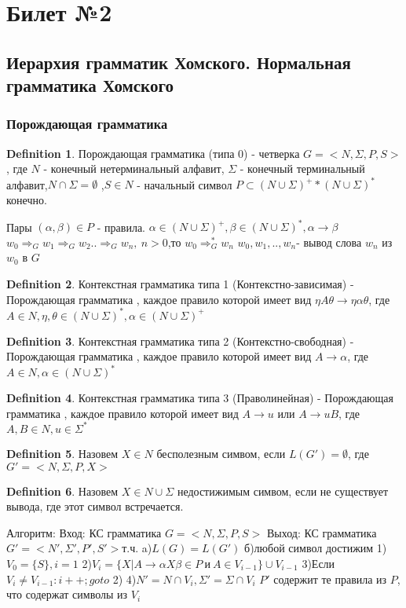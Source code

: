 \documentclass[a4paper]{article}
\theoremstyle{plain}
\theoremstyle{remark}
\theoremstyle{definition}
\newtheorem*{definition-star}{Definition}
\begin{document}
\section{Билет №2}
\subsection{Иерархия грамматик Хомского. Нормальная грамматика Хомского}
\subsubsection {Порождающая грамматика}
\begin{definition-star} Порождающая грамматика (типа 0) - четверка $G=<N,\Sigma,P,S>$, где
$N$ - конечный нетерминальный алфавит, $\Sigma$ - конечный терминальный алфавит,$N\cap\Sigma=\emptyset$ ,$S \in N$ - начальный символ
$P \subset (N\cup\Sigma)^+*(N\cup\Sigma)^*$конечно.
\end{definition-star}
Пары $(\alpha,\beta)\in P$ - правила. $\alpha \in(N\cup\Sigma)^+, \beta \in(N\cup\Sigma)^*,\alpha\rightarrow\beta$
$w_0\Rightarrow_G w_1 \Rightarrow_G w_2 ..\Rightarrow_G w_n,\ n>0$,то $w_0\Rightarrow^*_G w_n$
$w_0,w_1,..,w_n$- вывод слова $w_n$ из $w_0$ в $G$
\begin{definition-star}Контекстная грамматика типа 1 (Контекстно-зависимая) - Порождающая грамматика , каждое правило которой имеет вид $\eta A \theta \rightarrow \eta \alpha \theta$, где  $A \in N, \eta,\theta \in (N\cup\Sigma)^*, \alpha \in (N\cup \Sigma)^+$
\end{definition-star}
\begin{definition-star}Контекстная грамматика типа 2 (Контекстно-свободная) - Порождающая грамматика , каждое правило которой имеет вид $A \rightarrow  \alpha$, где  $A \in N,  \alpha \in (N\cup \Sigma)^*$
\end{definition-star}
\begin{definition-star}Контекстная грамматика типа 3 (Праволинейная) - Порождающая грамматика , каждое правило которой имеет вид $A \rightarrow  u$ или $A \rightarrow  uB$, где  $A,B \in N,  u\in \Sigma^*$
\end{definition-star}
\begin{definition-star}Назовем $X \in N$ бесполезным симвом, если $L(G')=\emptyset$, где $G'=<N,\Sigma,P,X>$
\end{definition-star}
\begin{definition-star}Назовем $X \in N\cup \Sigma$ недостижимым симвом, если не существует вывода, где этот символ встречается.
\end{definition-star}
Алгоритм:
Вход: КС грамматика $G=<N,\Sigma,P,S>$
Выход: КС грамматика $G'=<N',\Sigma',P',S'>$т.ч.
a)$L(G)=L(G')$
б)любой символ достижим
1)$V_0=\{S\},i=1$
2)$V_i=\{X|A\rightarrow\alpha X \beta \in P \ и \ A\in V_{i-1}\}\cup V_{i-1}$
3)Если $V_i\ne V_{i-1}:  i++; goto $ 2)
4)$N'=N\cap V_i, \Sigma'=\Sigma \cap V_i$
$P'$ содержит те правила из $P$, что содержат символы из $V_i$
\end{document}
